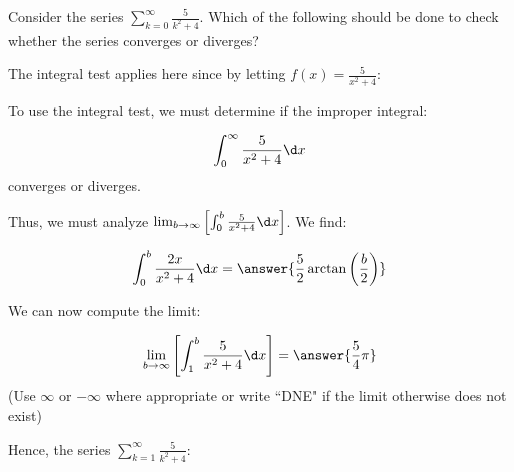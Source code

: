\documentclass{ximera}
\author{Jim Talamo}
\begin{document}
\begin{exercise}
Consider the series $\sum_{k=0}^{\infty} \frac{5}{k^2+4}$.  Which of the following should be done to check whether the series converges or diverges?
\begin{multipleChoice}
\end{multipleChoice}

\begin{exercise}
The integral test applies here since by letting $f(x) = \frac{5}{x^2+4}$:
\begin{selectAll}
\end{selectAll}

To use the integral test, we must determine if the improper integral:

\[
\int_0^{\infty} \frac{5}{x^2+4} \d x
\]
converges or diverges.

Thus, we must analyze $\lim_{b \to \infty} \left[\int_0^b \frac{5}{x^2+4} \d x\right]$.  We find:

\[
\int_0^b \frac{2x}{x^2+4} \d x = \answer{\frac{5}{2} \arctan\left(\frac{b}{2}\right)}
\]

\begin{exercise}
We can now compute the limit:

\[ \lim_{b \to \infty} \left[\int_1^b \frac{5}{x^2+4} \d x\right] = \answer{\frac{5}{4} \pi} \]
(Use $\infty$ or $-\infty$ where appropriate or write ``DNE" if the limit otherwise does not exist)

Hence, the series  $\sum_{k=1}^{\infty} \frac{5}{k^2+4}$:
\begin{multipleChoice}
\end{multipleChoice}
\end{exercise}
\end{exercise}
\end{exercise}
\end{document}

